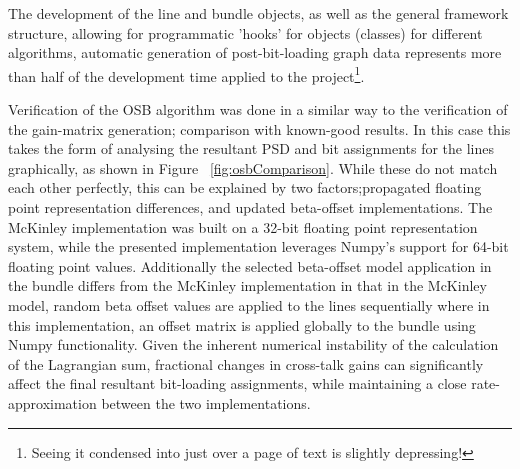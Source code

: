 The development of the line and bundle objects, as well as the general framework structure, allowing for programmatic 'hooks' for objects (classes) for different algorithms, automatic generation of post-bit-loading graph data represents more than half of the development time applied to the project\footnote{Seeing it condensed into just over a page of text is slightly depressing!}.

Verification of the OSB algorithm was done in a similar way to the verification of the gain-matrix generation; comparison with known-good results. In this case this takes the form of analysing the resultant PSD and bit assignments for the lines graphically, as shown in Figure ~\ref{fig:osbComparison}. While these do not match each other perfectly, this can be explained by two factors;propagated floating point representation differences, and updated beta-offset implementations. The McKinley implementation was built on a 32-bit floating point representation system, while the presented implementation leverages Numpy's support for 64-bit floating point values. Additionally the selected beta-offset model application in the bundle differs from the McKinley implementation in that in the McKinley model, random beta offset values are applied to the lines sequentially where in this implementation, an offset matrix is applied globally to the bundle using Numpy functionality. Given the inherent numerical instability of the calculation of the Lagrangian sum, fractional changes in cross-talk gains can significantly affect the final resultant bit-loading assignments, while maintaining a close rate-approximation between the two implementations.

